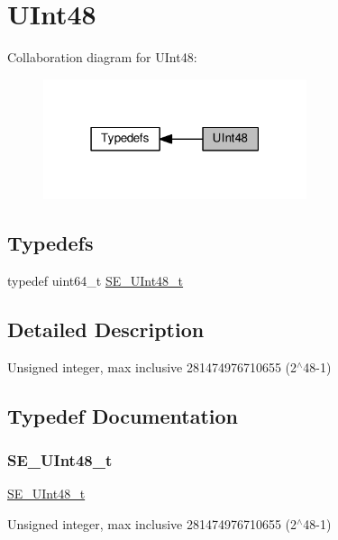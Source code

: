 \hypertarget{group__UInt48}{}\section{U\+Int48}
\label{group__UInt48}
Collaboration diagram for U\+Int48\+:\nopagebreak
\begin{figure}[H]
\begin{center}
\leavevmode
\includegraphics[width=219pt]{group__UInt48}
\end{center}
\end{figure}
\subsection*{Typedefs}
\begin{DoxyCompactItemize}
\item 
typedef uint64\+\_\+t \hyperlink{group__UInt48_gaa15d726fc29126d24b991437334d77a0}{S\+E\+\_\+\+U\+Int48\+\_\+t}
\end{DoxyCompactItemize}


\subsection{Detailed Description}
Unsigned integer, max inclusive 281474976710655 (2$^\wedge$48-\/1) 

\subsection{Typedef Documentation}
\mbox{\label{group__UInt48_gaa15d726fc29126d24b991437334d77a0}} 
\subsubsection{\texorpdfstring{S\+E\+\_\+\+U\+Int48\+\_\+t}{SE\_UInt48\_t}}
{\footnotesize\ttfamily \hyperlink{group__UInt48_gaa15d726fc29126d24b991437334d77a0}{S\+E\+\_\+\+U\+Int48\+\_\+t}}

Unsigned integer, max inclusive 281474976710655 (2$^\wedge$48-\/1) 